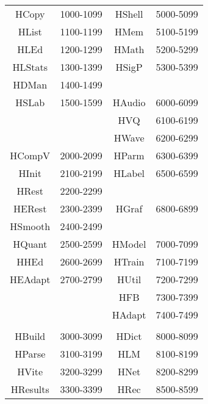\begin{itemize}
\begin{center}
\begin{tabular}{|c|c|c|c|}
\hline
HCopy    & 1000-1099     & HShell        & 5000-5099    \\
HList    & 1100-1199     & HMem          & 5100-5199    \\
HLEd     & 1200-1299     & HMath         & 5200-5299    \\
HLStats  & 1300-1399     & HSigP         & 5300-5399    \\
HDMan    & 1400-1499     &               &              \\
HSLab    & 1500-1599     & HAudio        & 6000-6099    \\
         &               & HVQ           & 6100-6199    \\
         &               & HWave         & 6200-6299    \\
HCompV   & 2000-2099     & HParm         & 6300-6399    \\
HInit    & 2100-2199     & HLabel        & 6500-6599    \\
HRest    & 2200-2299     &               &              \\
HERest   & 2300-2399     & HGraf         & 6800-6899    \\
HSmooth  & 2400-2499     &               &              \\
HQuant   & 2500-2599     & HModel        & 7000-7099    \\
HHEd     & 2600-2699     & HTrain        & 7100-7199    \\
HEAdapt  & 2700-2799     & HUtil         & 7200-7299    \\
         &               & HFB           & 7300-7399    \\
         &               & HAdapt        & 7400-7499    \\
         &               &               &              \\
HBuild   & 3000-3099     & HDict         & 8000-8099    \\
HParse   & 3100-3199     & HLM           & 8100-8199    \\
HVite    & 3200-3299     & HNet          & 8200-8299    \\
HResults & 3300-3399     & HRec          & 8500-8599    \\
\hline
\end{tabular}
\end{center}


\end{itemize}
